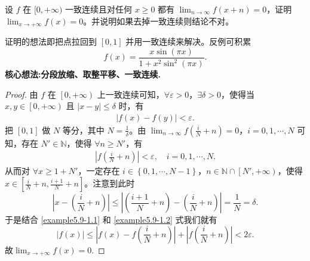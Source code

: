 \documentclass[../../main.tex]{subfiles}%
\begin{document}
\begin{example}
设 \( f \) 在 \([0,+\infty)\) 一致连续且对任何 \( x \geqslant  0 \) 都有 \(\lim_{n \to \infty} f(x+n) = 0\)，证明 \(\lim_{x \to +\infty} f(x) = 0\)。并说明如果去掉一致连续则结论不对。
\end{example}
\begin{note}
证明的想法即把点拉回到 \([0,1]\) 并用一致连续来解决。反例可积累
\[
f(x) = \frac{x \sin (\pi x)}{1 + x^2 \sin^2 (\pi x)}.
\]
\textbf{核心想法:分段放缩、取整平移、一致连续.}
\end{note}
\begin{proof}
由 $f$ 在 $\left[ 0, +\infty \right)$ 上一致连续可知，$\forall \varepsilon > 0$，$\exists \delta > 0$，使得当 $x, y \in \left[ 0, +\infty \right)$ 且 $\left| x - y \right| \leqslant \delta$ 时，有
\begin{align}
\left| f\left( x \right) - f\left( y \right) \right| < \varepsilon. \label{example5.9-1.1}
\end{align}
把 $\left[ 0,1 \right]$ 做 $N$ 等分，其中 $N = \frac{1}{\delta}$。由 $\lim_{n \rightarrow \infty} f\left( \frac{i}{N} + n \right) = 0$，$i = 0, 1, \cdots, N$ 可知，存在 $N' \in \mathbb{N}$，使得 $\forall n \geqslant N'$，有
\begin{align}
\left| f\left( \frac{i}{N} + n \right) \right| < \varepsilon, \quad i = 0, 1, \cdots, N. \label{example5.9-1.2} 
\end{align}
从而对 $\forall x \geqslant 1 + N'$，一定存在 $i \in \left\{ 0, 1, \cdots, N - 1 \right\}$，$n \in \mathbb{N} \cap \left[ N', +\infty \right)$，使得 $x \in \left[ \frac{i}{N} + n, \frac{i + 1}{N} + n \right]$。注意到此时
\[
\left| x - \left( \frac{i}{N} + n \right) \right| \leqslant \left| \left( \frac{i + 1}{N} + n \right) - \left( \frac{i}{N} + n \right) \right| = \frac{1}{N} = \delta.
\]
于是结合 \eqref{example5.9-1.1} 和 \eqref{example5.9-1.2} 式我们就有
\[
\left| f\left( x \right) \right| \leqslant \left| f\left( x \right) - f\left( \frac{i}{N} + n \right) \right| + \left| f\left( \frac{i}{N} + n \right) \right| < 2\varepsilon.
\]
故\(\lim_{x \to +\infty} f(x) = 0\).
\end{proof}
\end{document}
